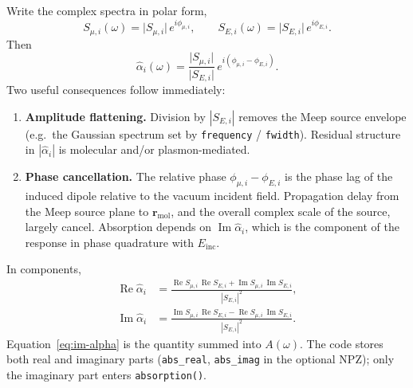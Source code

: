 \documentclass[11pt,a4paper]{article}
\begin{document}
Write the complex spectra in polar form,
\begin{equation}
  S_{\mu,i}(\omega)
  =
  \big|S_{\mu,i}\big|\, e^{i\phi_{\mu,i}},
  \qquad
  S_{E,i}(\omega)
  =
  \big|S_{E,i}\big|\, e^{i\phi_{E,i}}.
\end{equation}
Then
\begin{equation}
  \hat\alpha_i(\omega)
  =
  \frac{\big|S_{\mu,i}\big|}{\big|S_{E,i}\big|}
  \,
  e^{i(\phi_{\mu,i}-\phi_{E,i})}.
  \label{eq:polar}
\end{equation}
Two useful consequences follow immediately:
\begin{enumerate}
  \item \textbf{Amplitude flattening.}
        Division by $|S_{E,i}|$ removes the Meep source envelope
        (e.g.\ the Gaussian spectrum set by \texttt{frequency} /
        \texttt{fwidth}).  Residual structure in
        $|\hat\alpha_i|$ is molecular and/or plasmon-mediated.
  \item \textbf{Phase cancellation.}
        The relative phase $\phi_{\mu,i}-\phi_{E,i}$ is the phase lag of
        the induced dipole relative to the vacuum incident field.
        Propagation delay from the Meep source plane to
        $\mathbf{r}_{\mathrm{mol}}$, and the overall complex scale of the
        source, largely cancel.  Absorption depends on
        $\operatorname{Im}\hat\alpha_i$, which is the component of the
        response in phase quadrature with $E_{\mathrm{inc}}$.
\end{enumerate}

In components,
\begin{align}
  \operatorname{Re}\hat\alpha_i
  &=
  \frac{
    \operatorname{Re}S_{\mu,i}\,\operatorname{Re}S_{E,i}
    +
    \operatorname{Im}S_{\mu,i}\,\operatorname{Im}S_{E,i}
  }{
    |S_{E,i}|^2
  },
  \label{eq:re-alpha} \\[0.4em]
  \operatorname{Im}\hat\alpha_i
  &=
  \frac{
    \operatorname{Im}S_{\mu,i}\,\operatorname{Re}S_{E,i}
    -
    \operatorname{Re}S_{\mu,i}\,\operatorname{Im}S_{E,i}
  }{
    |S_{E,i}|^2
  }.
  \label{eq:im-alpha}
\end{align}
Equation~\eqref{eq:im-alpha} is the quantity summed into $A(\omega)$.
The code stores both real and imaginary parts (\texttt{abs\_real},
\texttt{abs\_imag} in the optional NPZ); only the imaginary part enters
\texttt{absorption()}.
\end{document}
